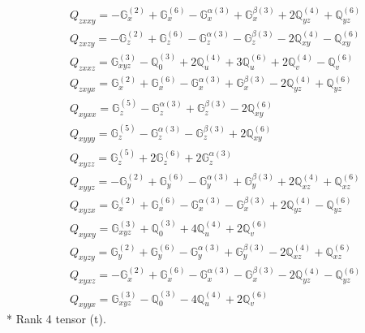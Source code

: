 \documentclass[fleqn,8pt,landscape]{jsarticle}
\begin{document}
\begin{align*}
& Q_{zxxy} = - \mathbb{G}_{x}^{(2)} + \mathbb{G}_{x}^{(6)} - \mathbb{G}_{x}^{\alpha(3)} + \mathbb{G}_{x}^{\beta(3)} + 2 \mathbb{Q}_{yz}^{(4)} + \mathbb{Q}_{yz}^{(6)} \\
& Q_{zxzy} = - \mathbb{G}_{z}^{(2)} + \mathbb{G}_{z}^{(6)} - \mathbb{G}_{z}^{\alpha(3)} - \mathbb{G}_{z}^{\beta(3)} - 2 \mathbb{Q}_{xy}^{(4)} - \mathbb{Q}_{xy}^{(6)} \\
& Q_{zxxz} = \mathbb{G}_{xyz}^{(3)} - \mathbb{Q}_{0}^{(3)} + 2 \mathbb{Q}_{u}^{(4)} + 3 \mathbb{Q}_{u}^{(6)} + 2 \mathbb{Q}_{v}^{(4)} - \mathbb{Q}_{v}^{(6)} \\
& Q_{zxyx} = \mathbb{G}_{x}^{(2)} + \mathbb{G}_{x}^{(6)} - \mathbb{G}_{x}^{\alpha(3)} + \mathbb{G}_{x}^{\beta(3)} - 2 \mathbb{Q}_{yz}^{(4)} + \mathbb{Q}_{yz}^{(6)} \\
& Q_{xyxx} = \mathbb{G}_{z}^{(5)} - \mathbb{G}_{z}^{\alpha(3)} + \mathbb{G}_{z}^{\beta(3)} - 2 \mathbb{Q}_{xy}^{(6)} \\
& Q_{xyyy} = \mathbb{G}_{z}^{(5)} - \mathbb{G}_{z}^{\alpha(3)} - \mathbb{G}_{z}^{\beta(3)} + 2 \mathbb{Q}_{xy}^{(6)} \\
& Q_{xyzz} = \mathbb{G}_{z}^{(5)} + 2 \mathbb{G}_{z}^{(6)} + 2 \mathbb{G}_{z}^{\alpha(3)} \\
& Q_{xyyz} = - \mathbb{G}_{y}^{(2)} + \mathbb{G}_{y}^{(6)} - \mathbb{G}_{y}^{\alpha(3)} + \mathbb{G}_{y}^{\beta(3)} + 2 \mathbb{Q}_{xz}^{(4)} + \mathbb{Q}_{xz}^{(6)} \\
& Q_{xyzx} = \mathbb{G}_{x}^{(2)} + \mathbb{G}_{x}^{(6)} - \mathbb{G}_{x}^{\alpha(3)} - \mathbb{G}_{x}^{\beta(3)} + 2 \mathbb{Q}_{yz}^{(4)} - \mathbb{Q}_{yz}^{(6)} \\
& Q_{xyxy} = \mathbb{G}_{xyz}^{(3)} + \mathbb{Q}_{0}^{(3)} + 4 \mathbb{Q}_{u}^{(4)} + 2 \mathbb{Q}_{v}^{(6)} \\
& Q_{xyzy} = \mathbb{G}_{y}^{(2)} + \mathbb{G}_{y}^{(6)} - \mathbb{G}_{y}^{\alpha(3)} + \mathbb{G}_{y}^{\beta(3)} - 2 \mathbb{Q}_{xz}^{(4)} + \mathbb{Q}_{xz}^{(6)} \\
& Q_{xyxz} = - \mathbb{G}_{x}^{(2)} + \mathbb{G}_{x}^{(6)} - \mathbb{G}_{x}^{\alpha(3)} - \mathbb{G}_{x}^{\beta(3)} - 2 \mathbb{Q}_{yz}^{(4)} - \mathbb{Q}_{yz}^{(6)} \\
& Q_{xyyx} = \mathbb{G}_{xyz}^{(3)} - \mathbb{Q}_{0}^{(3)} - 4 \mathbb{Q}_{u}^{(4)} + 2 \mathbb{Q}_{v}^{(6)}
\end{align*}
* Rank 4 tensor (t).
\end{document}

